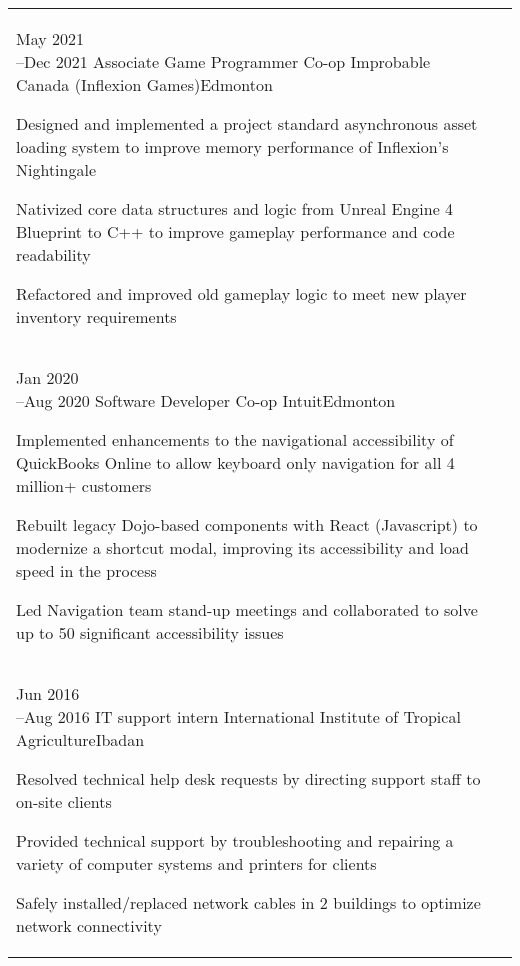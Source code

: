 \documentclass[a4paper]{modernsimplecv}
\begin{document}
\begin{paracol}{2}
\begin{minipage}[t]{\rightcolwidth}
\begin{tabular}{@{\raggedright}p{} |>{\raggedright\arraybackslash}p{}}
                \cvevent{May 2021\newline --Dec 2021}
                {Associate Game Programmer Co-op}
                {Improbable Canada (Inflexion Games)}{Edmonton}
                {\begin{tabitemize}
                    \item Designed and implemented a project standard asynchronous asset loading system to improve memory performance of Inflexion's Nightingale
                    \item Nativized core data structures and logic from Unreal Engine 4 Blueprint to C++ to improve gameplay performance and code readability
                    \item Refactored and improved old gameplay logic to meet new player inventory requirements
                \end{tabitemize}
                } \\
                \cvevent{Jan 2020\newline --Aug 2020}
                {Software Developer Co-op}
                {Intuit}{Edmonton}
                {\begin{tabitemize}
                    \item Implemented enhancements to the navigational accessibility of QuickBooks Online to allow keyboard only navigation for all 4 million+ customers
                    \item Rebuilt legacy Dojo-based components with React (Javascript) to modernize a shortcut modal, improving its accessibility and load speed in the process
                    \item Led Navigation team stand-up meetings and collaborated to solve up to 50 significant accessibility issues
                \end{tabitemize}
                } \\
                \cvevent{Jun 2016\newline --Aug 2016}
                {IT support intern}
                {International Institute of Tropical Agriculture}{Ibadan}
                {\begin{tabitemize}
                    \item Resolved technical help desk requests by directing support staff to on-site clients
                    \item Provided technical support by troubleshooting and repairing a variety of computer systems and printers for clients
                    \item Safely installed/replaced network cables in 2 buildings to optimize network connectivity
                \end{tabitemize}
                \vspace{-\baselineskip}\mbox{}
                }
            \end{tabular}
            \vspace{1em}
        \end{minipage}


\end{paracol}
\end{document}
